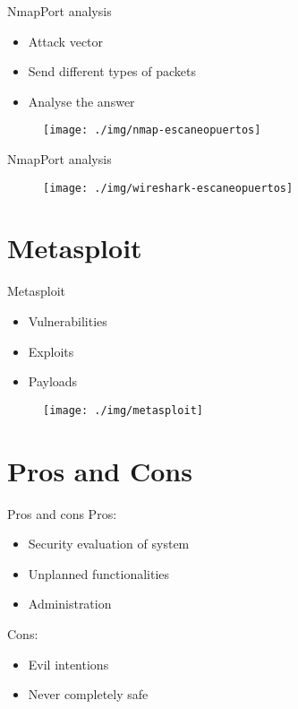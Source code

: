 \documentclass{beamer}
\begin{document}
\begin{frame}{Nmap}{Port analysis}
  \begin{itemize}
  \item Attack vector
  \item Send different types of packets
  \item Analyse the answer
  \end{itemize}
          \begin{figure}[h]
    \centering
    \texttt{[image: ./img/nmap-escaneopuertos]}
  \end{figure}
\end{frame}

\begin{frame}{Nmap}{Port analysis}
          \begin{figure}[h]
    \centering
    \texttt{[image: ./img/wireshark-escaneopuertos]}
  \end{figure}
\end{frame}

\section{Metasploit}
\begin{frame}{Metasploit}

  \begin{itemize}
  \item Vulnerabilities
  \item Exploits
  \item Payloads
  \end{itemize}
            \begin{figure}[h]
    \centering
    \texttt{[image: ./img/metasploit]}
  \end{figure}
\end{frame}

\section{Pros and Cons}
\begin{frame}{Pros and cons}
  Pros:
    \begin{itemize}
  \item Security evaluation of system
  \item Unplanned functionalities
  \item Administration 
    \end{itemize}

    Cons:
      \begin{itemize}
  \item Evil intentions
  \item Never completely safe
  \end{itemize}
\end{frame}
\end{document}
